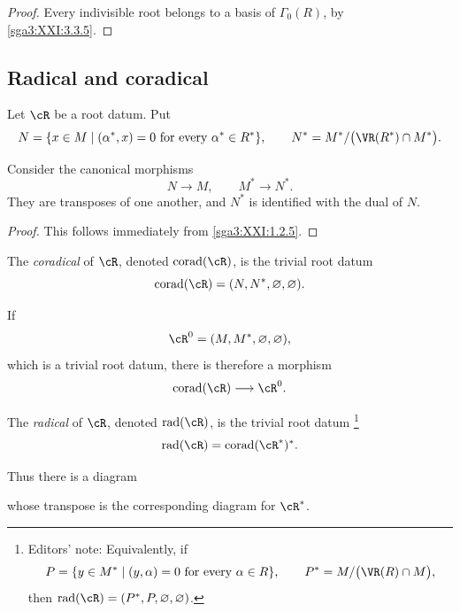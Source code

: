 \begin{proof}
Every indivisible root belongs to a basis of \(\Gamma_0(R)\), by
\ref{sga3:XXI:3.3.5}.
\end{proof}


\subsection{Radical and coradical}\label{sga3:XXI:6.3}

Let \(\cR\) be a root datum. Put
\[
 N=\{x\in M\mid(\alpha^\ast,x)=0
       \text{ for every }\alpha^\ast\in R^\ast\},
\qquad
 N^\ast=M^\ast/\bigl(\VR(R^\ast)\cap M^\ast\bigr).
\]

\begin{lemma}\label{sga3:XXI:6.3.1}
Consider the canonical morphisms
\[
 N\longrightarrow M,
 \qquad
 M^\ast\longrightarrow N^\ast.
\]
They are transposes of one another, and \(N^\ast\) is identified with
the dual of \(N\).
\end{lemma}

\begin{proof}
This follows immediately from \ref{sga3:XXI:1.2.5}.
\end{proof}

\begin{definition}\label{sga3:XXI:6.3.2}
The \emph{coradical} of \(\cR\), denoted
\(\operatorname{corad}(\cR)\), is the trivial root datum
\[
 \operatorname{corad}(\cR)=(N,N^\ast,\varnothing,\varnothing).
\]
\end{definition}

If
\[
 \cR^0=(M,M^\ast,\varnothing,\varnothing),
\]
which is a trivial root datum, there is therefore a morphism
\[
 \operatorname{corad}(\cR)\longrightarrow\cR^0.
\]

\begin{definition}\label{sga3:XXI:6.3.3}
The \emph{radical} of \(\cR\), denoted
\(\operatorname{rad}(\cR)\), is the trivial root datum
\footnote{Editors' note: Equivalently, if
\[
 P=\{y\in M^\ast\mid(y,\alpha)=0\text{ for every }\alpha\in R\},
 \qquad
 P^\ast=M/\bigl(\VR(R)\cap M\bigr),
\]
then
\(\operatorname{rad}(\cR)=(P^\ast,P,\varnothing,\varnothing)\).}
\[
 \operatorname{rad}(\cR)=\operatorname{corad}(\cR^\ast)^\ast.
\]
\end{definition}

Thus there is a diagram
\begin{center}
\end{center}
whose transpose is the corresponding diagram for \(\cR^\ast\).

